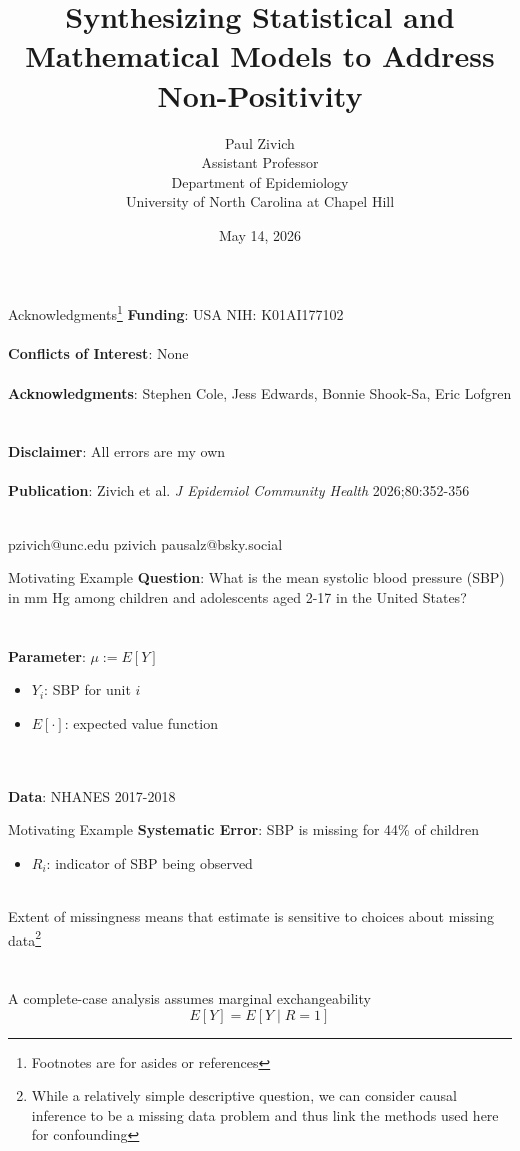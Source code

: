 \documentclass[aspectratio=169]{beamer}
\title[Synthesizing for Non-Positivity]{Synthesizing Statistical and Mathematical Models to Address Non-Positivity}
\author[PN Zivich]{Paul Zivich \\ Assistant Professor \\ Department of Epidemiology \\ University of North Carolina at Chapel Hill}
\date{May 14, 2026}
\begin{document}
	
\begin{frame}[plain]
	\maketitle
\end{frame}

\begin{frame}{Acknowledgments\footnote[frame]{Footnotes are for asides or references}}
	\textbf{Funding}: USA NIH: K01AI177102
	~\\~\\
	\textbf{Conflicts of Interest}: None
	~\\~\\
	\textbf{Acknowledgments}: Stephen Cole, Jess Edwards, Bonnie Shook-Sa, Eric Lofgren
	~\\~\\
	\textbf{Disclaimer}: All errors are my own
	~\\~\\
	\textbf{Publication}: Zivich et al. \textit{J Epidemiol Community Health} 2026;80:352-356
	~\\~\\
	\begin{center}
		\small
		\faEnvelope \quad pzivich@unc.edu \qquad \quad 
		\faGithub \quad pzivich \qquad \quad
		\faHashtag \quad pausalz@bsky.social
	\end{center}	
\end{frame}

\begin{frame}{Motivating Example}
	\textbf{Question}: What is the mean systolic blood pressure (SBP) in mm Hg among children and adolescents aged 2-17 in the United States?
	\\~\\~\\
	\textbf{Parameter}: $\mu := E[Y]$
	\begin{itemize}
		\item $Y_i$: SBP for unit $i$
		\item $E[\cdot]$: expected value function  
	\end{itemize}
	~\\~\\
	\textbf{Data}: NHANES 2017-2018
\end{frame}

\begin{frame}{Motivating Example}
	\textbf{Systematic Error}: SBP is missing for 44\% of children
	\begin{itemize}
		\item $R_i$: indicator of SBP being observed
	\end{itemize}
	~\\
	Extent of missingness means that estimate is sensitive to choices about missing data\footnote[frame]{While a relatively simple descriptive question, we can consider causal inference to be a missing data problem and thus link the methods used here for confounding}
	~\\~\\~\\
	A complete-case analysis assumes marginal exchangeability
	$$ E[Y] = E[Y \mid R=1] $$
\end{frame}
\end{document}
